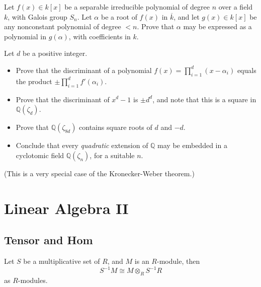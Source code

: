 \documentclass[openany]{book}
\begin{document}
\begin{prob}
Let \( f(x) \in k[x] \) be a separable irreducible polynomial of degree \( n \) over a field \( k \), with Galois group \( S_n \). Let \( \alpha \) be a root of \( f(x) \) in \( \overline{k} \), and let \( g(x) \in k[x] \) be any nonconstant polynomial of degree \( < n \). Prove that \( \alpha \) may be expressed as a polynomial in \( g(\alpha) \), with coefficients in \( k \).
\end{prob}

\begin{prob}
Let \( d \) be a positive integer.  

\begin{itemize}
    \item Prove that the discriminant of a polynomial \( f(x) = \prod_{i=1}^d (x - \alpha_i) \) equals the product \( \pm \prod_{i=1}^d f'(\alpha_i) \).  
    \item Prove that the discriminant of \( x^d - 1 \) is \( \pm d^d \), and note that this is a square in \( \mathbb{Q}(\zeta_d) \).  
    \item Prove that \( \mathbb{Q}(\zeta_{8d}) \) contains square roots of \( d \) and \( -d \).  
    \item Conclude that every \emph{quadratic} extension of \( \mathbb{Q} \) may be embedded in a cyclotomic field \( \mathbb{Q}(\zeta_n) \), for a suitable \( n \).  
\end{itemize}

(This is a very special case of the Kronecker-Weber theorem.)
\end{prob}


















\chapter{Linear Algebra II}



\section{Tensor and Hom}
\begin{prop}
    Let $S$ be a multiplicative set of $R$, and $M$ is an $R$-module, then 
    \begin{equation*}
        S^{-1}M\cong M\otimes_R S^{-1}R
    \end{equation*}
    as $R$-modules.
\end{prop}
\end{document}
